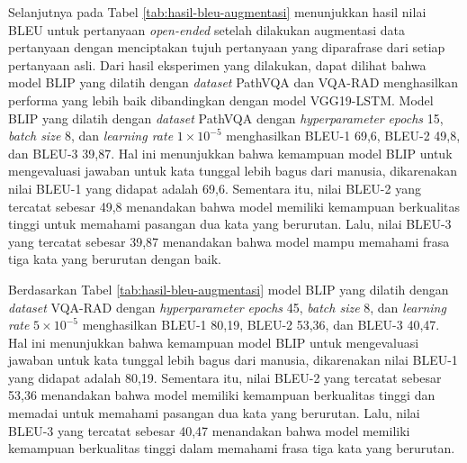 \par Selanjutnya pada Tabel \ref{tab:hasil-bleu-augmentasi} menunjukkan hasil nilai BLEU untuk pertanyaan \textit{open-ended} setelah dilakukan augmentasi data pertanyaan dengan menciptakan tujuh pertanyaan yang diparafrase dari setiap pertanyaan asli. Dari hasil eksperimen yang dilakukan, dapat dilihat bahwa model BLIP yang dilatih dengan \textit{dataset} PathVQA dan VQA-RAD menghasilkan performa yang lebih baik dibandingkan dengan model VGG19-LSTM. Model BLIP yang dilatih dengan \textit{dataset} PathVQA dengan \textit{hyperparameter} \textit{epochs} 15, \textit{batch size} 8, dan \textit{learning rate} $1 \times 10^{-5}$ menghasilkan BLEU-1 69,6, BLEU-2 49,8, dan BLEU-3 39,87. Hal ini menunjukkan bahwa kemampuan model BLIP untuk mengevaluasi jawaban untuk kata tunggal lebih bagus dari manusia, dikarenakan nilai BLEU-1 yang didapat adalah 69,6. Sementara itu, nilai BLEU-2 yang tercatat sebesar 49,8 menandakan bahwa model memiliki kemampuan berkualitas tinggi untuk memahami pasangan dua kata yang berurutan. Lalu, nilai BLEU-3 yang tercatat sebesar 39,87 menandakan bahwa model mampu memahami frasa tiga kata yang berurutan dengan baik.

\par Berdasarkan Tabel \ref{tab:hasil-bleu-augmentasi} model BLIP yang dilatih dengan \textit{dataset} VQA-RAD dengan \textit{hyperparameter} \textit{epochs} 45, \textit{batch size} 8, dan \textit{learning rate} $5 \times 10^{-5}$ menghasilkan BLEU-1 80,19, BLEU-2 53,36, dan BLEU-3 40,47. Hal ini menunjukkan bahwa kemampuan model BLIP untuk mengevaluasi jawaban untuk kata tunggal lebih bagus dari manusia, dikarenakan nilai BLEU-1 yang didapat adalah 80,19. Sementara itu, nilai BLEU-2 yang tercatat sebesar 53,36 menandakan bahwa model memiliki kemampuan berkualitas tinggi dan memadai untuk memahami pasangan dua kata yang berurutan. Lalu, nilai BLEU-3 yang tercatat sebesar 40,47 menandakan bahwa model memiliki kemampuan berkualitas tinggi dalam memahami frasa tiga kata yang berurutan.


